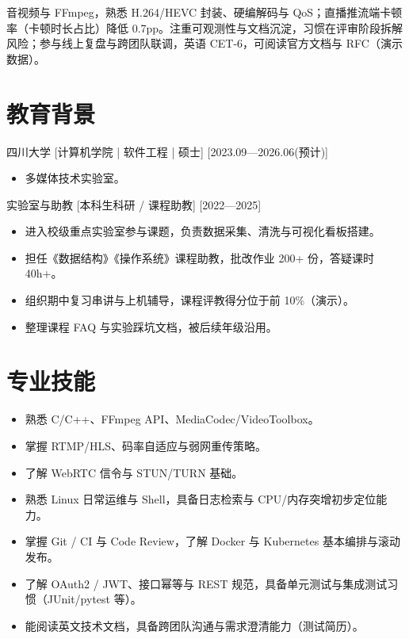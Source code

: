 \documentclass{resume-photo}
\begin{document}

\ResumeTitle

\noindent 音视频与 FFmpeg，熟悉 H.264/HEVC 封装、硬编解码与 QoS；直播推流端卡顿率（卡顿时长占比）降低 0.7pp。注重可观测性与文档沉淀，习惯在评审阶段拆解风险；参与线上复盘与跨团队联调，英语 CET-6，可阅读官方文档与 RFC（演示数据）。

\section{教育背景}
\ResumeItem
{四川大学}
[\textnormal{计算机学院 | 软件工程 | 硕士}]
[2023.09—2026.06(预计)]

\begin{itemize}
  \item 多媒体技术实验室。
\end{itemize}


\ResumeItem
{实验室与助教}
[\textnormal{本科生科研 / 课程助教}]
[2022—2025]

\begin{itemize}
  \item 进入校级重点实验室参与课题，负责数据采集、清洗与可视化看板搭建。
  \item 担任《数据结构》《操作系统》课程助教，批改作业 200+ 份，答疑课时 40h+。
  \item 组织期中复习串讲与上机辅导，课程评教得分位于前 10\%（演示）。
  \item 整理课程 FAQ 与实验踩坑文档，被后续年级沿用。
\end{itemize}



\section{专业技能}
\begin{itemize}
  \item 熟悉 C/C++、FFmpeg API、MediaCodec/VideoToolbox。
  \item 掌握 RTMP/HLS、码率自适应与弱网重传策略。
  \item 了解 WebRTC 信令与 STUN/TURN 基础。
  \item 熟悉 Linux 日常运维与 Shell，具备日志检索与 CPU/内存突增初步定位能力。
  \item 掌握 Git / CI 与 Code Review，了解 Docker 与 Kubernetes 基本编排与滚动发布。
  \item 了解 OAuth2 / JWT、接口幂等与 REST 规范，具备单元测试与集成测试习惯（JUnit/pytest 等）。
  \item 能阅读英文技术文档，具备跨团队沟通与需求澄清能力（测试简历）。
\end{itemize}
\end{document}

